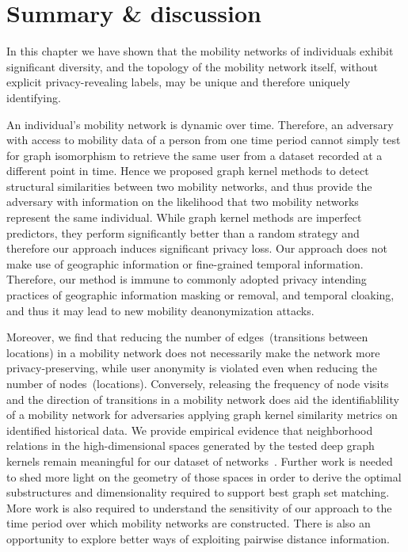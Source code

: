 \section{Summary \& discussion} %

In this chapter we have shown that the mobility networks of individuals exhibit significant diversity, and the topology of the mobility network itself, without explicit privacy-revealing labels, may be unique and therefore uniquely identifying.

An individual's mobility network is dynamic over time.
Therefore, an adversary with access to mobility data of a person from one time period cannot simply test for graph isomorphism to retrieve the same user from a dataset recorded at a different point in time.
Hence we proposed graph kernel methods to detect structural similarities between two mobility networks, and thus provide the adversary with information on the likelihood that two mobility networks represent the same individual.
While graph kernel methods are imperfect predictors, they perform significantly better than a random strategy and therefore our approach induces significant privacy loss.
Our approach does not make use of geographic information or fine-grained temporal information. Therefore, our method is immune to commonly adopted privacy intending practices of geographic information masking or removal, and temporal cloaking, and thus it may lead to new mobility deanonymization attacks.

Moreover, we find that reducing the number of edges~(transitions between locations) in a mobility network does not necessarily make the network more privacy-preserving, while user anonymity is violated even when reducing the number of nodes~(locations).
Conversely, releasing the frequency of node visits and the direction of transitions in a mobility network does aid the identifiablility of a mobility network for adversaries applying graph kernel similarity metrics on identified historical data.
We provide empirical evidence that neighborhood relations in the high-dimensional spaces generated by the tested deep graph kernels remain meaningful for our dataset of networks~\citep{Beyer}.
Further work is needed to shed more light on the geometry of those spaces in order to derive the optimal substructures and dimensionality required to support best graph set matching.
More work is also required to understand the sensitivity of our approach to the time period over which mobility networks are constructed.
There is also an opportunity to explore better ways of exploiting pairwise distance information.

